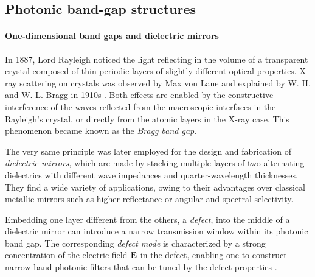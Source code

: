 

\subsection{Photonic band-gap structures} 
\paragraph{One-dimensional band gaps and dielectric mirrors}%
In 1887, Lord Rayleigh \cite{johnson2003introduction} noticed the light reflecting in the volume of a transparent crystal composed of thin periodic layers of slightly different optical properties. X-ray scattering on crystals was observed by Max von Laue \cite{friedrich1913interferenzerscheinungen} and explained by W. H. and W. L. Bragg in 1910s \cite{bragg1913reflection}. 
Both effects are enabled by the constructive interference of the waves reflected from the macroscopic interfaces in the Rayleigh's crystal, or directly from the atomic layers in the X-ray case. This phenomenon became known as the \textit{Bragg band gap}.

The very same principle was later %
employed for the design and fabrication of \textit{dielectric mirrors}, which are made by stacking multiple layers of two alternating dielectrics with different wave impedances and quarter-wavelength thicknesses. They find a wide variety of applications, owing to their advantages over classical metallic mirrors such as higher reflectance or angular and spectral selectivity.  %

Embedding one layer different from the others, a \textit{defect}, into the middle of a dielectric mirror can introduce a narrow transmission window within its photonic band gap. The corresponding \textit{defect mode} is characterized by a strong concentration of the electric field $\mathbf{E}$ in the defect, enabling one to construct narrow-band photonic filters that can be tuned by the defect properties \cite{nemec2005highly}.

